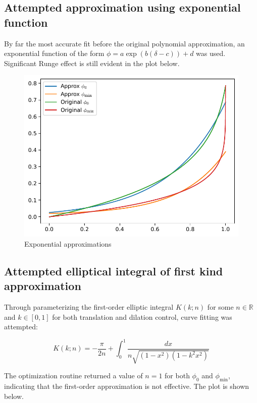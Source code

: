 \subsection{Attempted approximation using exponential function}

By far the most accurate fit before the original polynomial approximation, an exponential function of the form $\phi=a\exp(b(\delta-c))+d$ was used.
Significant Runge effect is still evident in the plot below.

\begin{figure}[H]
    \centering
    \includegraphics[scale=0.5]{plots/exponential-approx.pdf}
    \caption{Exponential approximations}
\end{figure}

\subsection{Attempted elliptical integral of first kind approximation}

Through parameterizing the first-order elliptic integral $K(k;n)$ for some $n\in \mathbb{R}$ and $k\in[0,1]$ for both translation and dilation control, curve fitting was attempted:

\begin{equation}
    K(k;n)=-\frac{\pi}{2n}+\int_0^1 \frac{dx}{n\sqrt{(1-x^2)(1-k^2x^2)}}
\end{equation}

The optimization routine returned a value of $n=1$ for both $\phi_0$ and $\phi_\mathrm{min}$, indicating that the first-order approximation is not effective. The plot is shown below.

